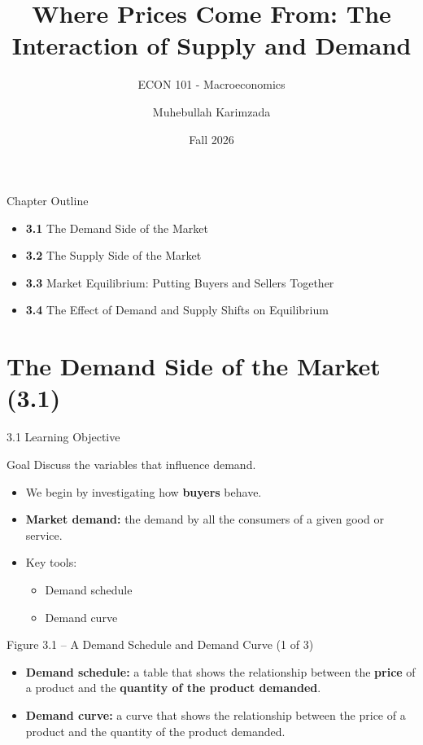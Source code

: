 \documentclass[aspectratio=169]{beamer}
\title{\textbf{Where Prices Come From: The Interaction of Supply and Demand \vspace{.5cm}\\  }}
\subtitle{ {\large ECON 101 - Macroeconomics}}
\author{Muhebullah Karimzada}
\date{Fall 2026}
\begin{document}
\begin{frame}[plain]
  \titlepage
\end{frame}

\begin{frame}{Chapter Outline}
\transfade
\begin{itemize}
  \item \textbf{3.1} The Demand Side of the Market
  \item \textbf{3.2} The Supply Side of the Market
  \item \textbf{3.3} Market Equilibrium: Putting Buyers and Sellers Together
  \item \textbf{3.4} The Effect of Demand and Supply Shifts on Equilibrium
\end{itemize}
\end{frame}

\section{The Demand Side of the Market (3.1)}

\begin{frame}{3.1 Learning Objective}
\transfade
\begin{block}{Goal}
Discuss the variables that influence demand.
\end{block}
\begin{itemize}
  \item We begin by investigating how \textbf{buyers} behave.
  \item \textbf{Market demand:} the demand by all the consumers of a given good or service.
  \item Key tools:
  \begin{itemize}
    \item Demand schedule
    \item Demand curve
  \end{itemize}
\end{itemize}
\end{frame}

\begin{frame}{Figure 3.1 -- A Demand Schedule and Demand Curve (1 of 3)}
\transfade
\begin{itemize}
  \item \textbf{Demand schedule:} a table that shows the relationship between the \textbf{price} of a product and the \textbf{quantity of the product demanded}.
  \item \textbf{Demand curve:} a curve that shows the relationship between the price of a product and the quantity of the product demanded.
\end{itemize}
\end{frame}
\end{document}
